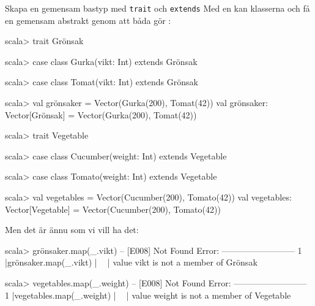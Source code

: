 \begin{Slide}{Skapa en gemensam bastyp med \texttt{trait} och \texttt{extends}}\SlideFontSmall
Med en \ifswedish{}\else{}\fi{} kan klasserna \ifswedish{}\else{}\fi{} och \ifswedish{}\else{}\fi{} få en gemensam abstrakt  genom att båda  gör \ifswedish{}\else{}\fi{}:
\ifswedish
\begin{REPL}
scala> trait Grönsak

scala> case class Gurka(vikt: Int) extends Grönsak

scala> case class Tomat(vikt: Int) extends Grönsak

scala> val grönsaker = Vector(Gurka(200), Tomat(42))
val grönsaker: Vector[Grönsak] = Vector(Gurka(200), Tomat(42))


\end{REPL}
\else
\begin{REPL}
scala> trait Vegetable

scala> case class Cucumber(weight: Int) extends Vegetable

scala> case class Tomato(weight: Int) extends Vegetable

scala> val vegetables = Vector(Cucumber(200), Tomato(42))
val vegetables: Vector[Vegetable] = Vector(Cucumber(200), Tomato(42))


\end{REPL}
\fi{}
\pause
Men det är ännu  som vi vill ha det:
\ifswedish
\begin{REPLnonum}
scala> grönsaker.map(_.vikt)
-- [E008] Not Found Error: --------------------------
1 |grönsaker.map(_.vikt)
  |              ^^^^^^
  |              value vikt is not a member of Grönsak
\end{REPLnonum}
\else
\begin{REPLnonum}
scala> vegetables.map(_.weight)
-- [E008] Not Found Error: --------------------------
1 |vegetables.map(_.weight)
  |              ^^^^^^
  |              value weight is not a member of Vegetable
\end{REPLnonum}
\fi{}
\end{Slide}



